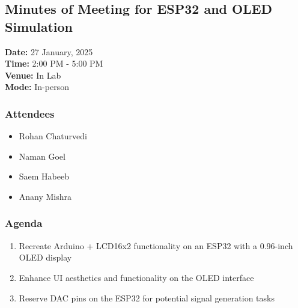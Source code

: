 \documentclass[12pt,a4paper]{article}
\begin{document}
\subsection*{Minutes of Meeting for ESP32 and OLED Simulation}

\noindent
\textbf{Date:} 27 January, 2025 \\
\textbf{Time:} 2:00 PM - 5:00 PM \\
\textbf{Venue:} In Lab \\
\textbf{Mode:} In-person \\

\subsubsection*{Attendees}
\begin{itemize}
    \item Rohan Chaturvedi
    \item Naman Goel
    \item Saem Habeeb
    \item Anany Mishra
\end{itemize}

\subsubsection*{Agenda}
\begin{enumerate}
    \item  Recreate Arduino + LCD16x2 functionality on an ESP32 with a 0.96-inch OLED display
    \item Enhance UI aesthetics and functionality on the OLED interface
    \item Reserve DAC pins on the ESP32 for potential signal generation tasks
\end{enumerate}
\end{document}
